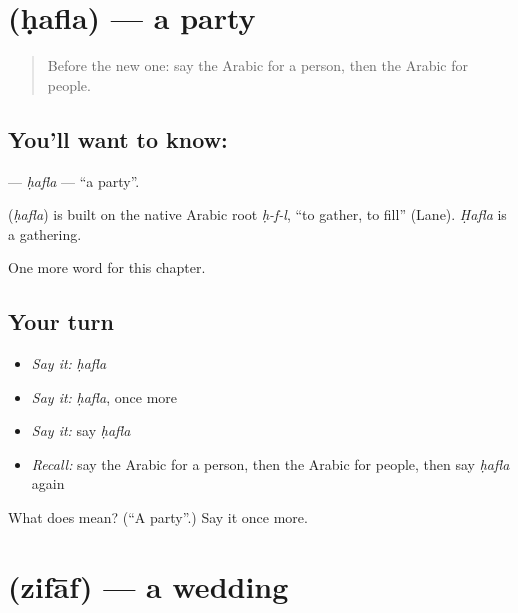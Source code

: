 \section[\texorpdfstring{\ar{حفلة} (ḥafla)}{حفلة (ḥafla)}]{ (ḥafla) — a party}

\label{lesson:AR-C275-hafla}



\begin{quote}
Before the new one: say the Arabic for a person, then the Arabic for people.
\end{quote}

\subsection*{You'll want to know: }
\textbf{} — \emph{ḥafla} — \textquotedblleft{}a party\textquotedblright{}.

\begin{cousinweb}
\textbf{} (\emph{ḥafla}) is built on the native Arabic root \emph{ḥ-f-l}, \textquotedblleft{}to gather, to fill\textquotedblright{} (Lane). \emph{Ḥafla} is a gathering.
\end{cousinweb}

\begin{grammarlens}[title={What you've built}]
One more word for this chapter.
\end{grammarlens}

\subsection*{Your turn}
\begin{itemize}
\raggedright
  \item \emph{Say it:} \emph{ḥafla}
  \item \emph{Say it:} \emph{ḥafla}, once more
  \item \emph{Say it:} say \emph{ḥafla}
  \item \emph{Recall:} say the Arabic for a person, then the Arabic for people, then say \emph{ḥafla} again
\end{itemize}

\begin{tcolorbox}[breakable,colback=teal!4,colframe=teal!35!black,title={Before you move on}]
What does  mean? (\textquotedblleft{}A party\textquotedblright{}.) Say it once more.
\end{tcolorbox}
\section[\texorpdfstring{\ar{زفاف} (zifāf)}{زفاف (zifāf)}]{ (zifāf) — a wedding}

